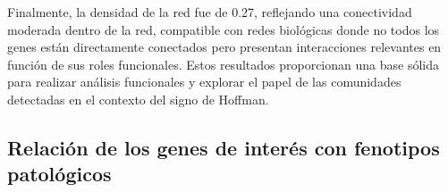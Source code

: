 Finalmente, la densidad de la red fue de 0.27, reflejando una conectividad moderada dentro de la red, compatible con redes biológicas donde no todos los genes están directamente conectados pero presentan interacciones relevantes en función de sus roles funcionales. Estos resultados proporcionan una base sólida para realizar análisis funcionales y explorar el papel de las comunidades detectadas en el contexto del signo de Hoffman.




\subsection{Relación de los genes de interés con fenotipos patológicos}